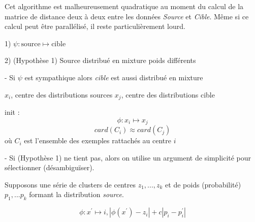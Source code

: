 Cet algorithme est malheureusement quadratique au moment du calcul de la 
matrice de distance deux à deux entre les données \emph{Source} et \emph{Cible}.
Même si ce calcul peut être parallélisé, il reste particulièrement lourd.



1) $\psi : \text{source} \mapsto \text{cible}$

2) (Hypothèse 1) Source distribué en mixture poids différents

- Si $\psi$ est sympathique alors \emph{cible} est aussi distribué en mixture

$x_i$, centre des distributions sources
$x_j$, centre des distributions cible

init :
$$\phi : x_i \mapsto x_j$$
$$card(C_i) \approx card(C_j)$$
où $C_i$ est l'ensemble des exemples rattachés au centre $i$

- Si (Hypothèse 1) ne tient pas, alors on utilise un argument de simplicité pour 
sélectionner (désambiguïser).

Supposons une série de clusters de centres $z_1, ..., z_k$ et de poids (probabilité)
$p_1, ... p_k$ formant la distribution \emph{source}.

$$\phi : x^\prime \mapsto i, |\phi(x^\prime) - z_i| + c |p_i-p_i^\prime|$$



